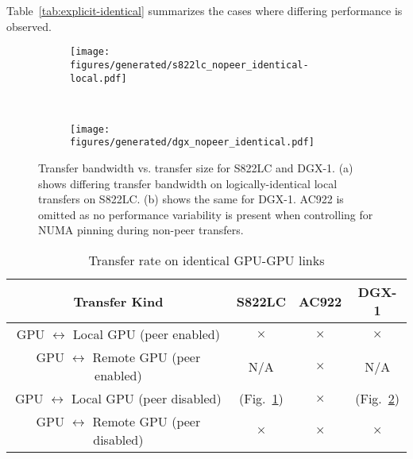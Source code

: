 Table~\ref{tab:explicit-identical} summarizes the cases where differing performance is observed.

\begin{figure}[ht]
	\centering
	\begin{subfigure}[b]{0.4\textwidth}
		\texttt{[image: figures/generated/s822lc\_nopeer\_identical-local.pdf]}
		\caption{}
		\label{fig:explicit-nopeer-identical-s822lc-local}
	\end{subfigure}
	~
	\begin{subfigure}[b]{0.4\textwidth}
		\texttt{[image: figures/generated/dgx\_nopeer\_identical.pdf]}
		\caption{}
		\label{fig:explicit-nopeer-identical-dgx-local}
	\end{subfigure}
	\caption[GPU-GPU \texttt{cudaMemcpy} Bandwidth on Identical Links]{
		Transfer bandwidth vs. transfer size for S822LC and DGX-1.
		(a) shows differing transfer bandwidth on logically-identical local transfers on S822LC.
		(b) shows the same for DGX-1.
		AC922 is omitted as no performance variability is present when controlling for NUMA pinning during non-peer transfers.
	}
	\label{fig:explicit-nopeer-identical}
\end{figure}

\begin{table}[ht]
	\centering
	\caption[Transfer rate on identical GPU-GPU links]{Transfer rate on identical GPU-GPU links}
	\label{tab:explicit}
	\begin{tabular}{cccc}
		\hline
		\textbf{Transfer Kind}                                           & S822LC                                                              & AC922     & DGX-1                                                           \\ \hline 
		\makecell{ GPU $\leftrightarrow$ Local GPU  \\ (peer enabled)  } & $\times$                                                            & $\times$  & $\times$                                                        \\ \hline
		\makecell{ GPU $\leftrightarrow$ Remote GPU \\ (peer enabled)  } & N/A                                                                 & $\times$  & N/A                                                             \\ \hline
		\makecell{ GPU $\leftrightarrow$ Local GPU  \\ (peer disabled) } & \checkmark (Fig.~\ref{fig:explicit-nopeer-identical-s822lc-local})  & $\times$  & \checkmark (Fig.~\ref{fig:explicit-nopeer-identical-dgx-local}) \\ \hline
		\makecell{ GPU $\leftrightarrow$ Remote GPU \\ (peer disabled) } & $\times$                                                            & $\times$  & $\times$                                                        \\ \hline
	\end{tabular}
\end{table}

